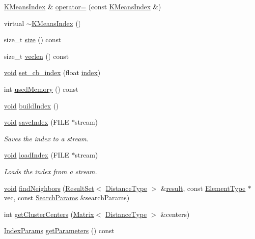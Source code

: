 \begin{DoxyCompactItemize}
\hyperlink{classcvflann_1_1KMeansIndex}{K\-Means\-Index} \& \hyperlink{classcvflann_1_1KMeansIndex_a8d2472fca09e17b351ed52b90e0d3b25}{operator=} (const \hyperlink{classcvflann_1_1KMeansIndex}{K\-Means\-Index} \&)
\item 
virtual \hyperlink{classcvflann_1_1KMeansIndex_a8aba38be2d90c7dd22eaa710e19ceb83}{$\sim$\-K\-Means\-Index} ()
\item 
size\-\_\-t \hyperlink{classcvflann_1_1KMeansIndex_accb5cd8cd1aec9b55420471537ee6423}{size} () const 
\item 
size\-\_\-t \hyperlink{classcvflann_1_1KMeansIndex_ad3c60e35d2f9face152ef9a8a303493a}{veclen} () const 
\item 
\hyperlink{legacy_8hpp_a8bb47f092d473522721002c86c13b94e}{void} \hyperlink{classcvflann_1_1KMeansIndex_ac65e5ca1bc0c0e1a4663438eff141861}{set\-\_\-cb\-\_\-index} (float \hyperlink{core__c_8h_a750b5d744c39a06bfb13e6eb010e35d0}{index})
\item 
int \hyperlink{classcvflann_1_1KMeansIndex_a95475eb6c639b87fa5e07812d6f4058a}{used\-Memory} () const 
\item 
\hyperlink{legacy_8hpp_a8bb47f092d473522721002c86c13b94e}{void} \hyperlink{classcvflann_1_1KMeansIndex_a8018b120cc79371b02e58b50f8992634}{build\-Index} ()
\item 
\hyperlink{legacy_8hpp_a8bb47f092d473522721002c86c13b94e}{void} \hyperlink{classcvflann_1_1KMeansIndex_a4c388bc8fab9af7ec567e00366ea14f6}{save\-Index} (F\-I\-L\-E $\ast$stream)
\begin{DoxyCompactList}\small\item\em Saves the index to a stream. \end{DoxyCompactList}\item 
\hyperlink{legacy_8hpp_a8bb47f092d473522721002c86c13b94e}{void} \hyperlink{classcvflann_1_1KMeansIndex_a11e0ff42576490042f640c2c382999d0}{load\-Index} (F\-I\-L\-E $\ast$stream)
\begin{DoxyCompactList}\small\item\em Loads the index from a stream. \end{DoxyCompactList}\item 
\hyperlink{legacy_8hpp_a8bb47f092d473522721002c86c13b94e}{void} \hyperlink{classcvflann_1_1KMeansIndex_a2e666baa48e5094e755c0ccdeb908b55}{find\-Neighbors} (\hyperlink{classcvflann_1_1ResultSet}{Result\-Set}$<$ \hyperlink{classcvflann_1_1KMeansIndex_adcf3e940c1ab76474f113c4db65d36c5}{Distance\-Type} $>$ \&\hyperlink{legacy_8hpp_a0bb77d54f6769867cfdf389897bd8e43}{result}, const \hyperlink{classcvflann_1_1KMeansIndex_a2a28d6535e3e452320f97417f6c127ef}{Element\-Type} $\ast$vec, const \hyperlink{structcvflann_1_1SearchParams}{Search\-Params} \&search\-Params)
\item 
int \hyperlink{classcvflann_1_1KMeansIndex_a773a603be17320c0d106662548407336}{get\-Cluster\-Centers} (\hyperlink{classcvflann_1_1Matrix}{Matrix}$<$ \hyperlink{classcvflann_1_1KMeansIndex_adcf3e940c1ab76474f113c4db65d36c5}{Distance\-Type} $>$ \&centers)
\item 
\hyperlink{namespacecvflann_a742b4c7076c21012054af74a9ee48289}{Index\-Params} \hyperlink{classcvflann_1_1KMeansIndex_a1e51703a5f49deda70a3eb1ce755ce45}{get\-Parameters} () const 
\end{DoxyCompactItemize}
